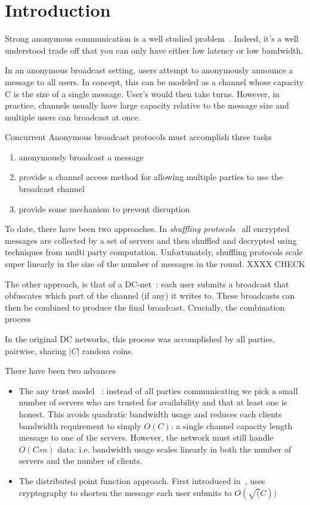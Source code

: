 
\section{Introduction}
Strong anonymous communication is a well studied problem~\cite{}. Indeed, it's a well understood trade off that you can only have either low latency or low bandwidth.

In an anonymous broadcast setting, users attempt to anonymously announce a message to all users. In concept, this can be modeled as a channel whose capacity C is the size of a single message. User's would then take turns. However, in practice, channels usually have large capacity relative to the message size and multiple users can broadcast at once.

Concurrent Anonymous broadcast protocols must accomplish three tasks
\begin{enumerate}
	\item anonymously broadcast a message
	\item provide a channel access method for allowing multiple parties to use the broadcast channel
	\item provide some mechanism to prevent disruption
\end{enumerate}

To date, there have been two approaches. In \emph{shuffling protocols}~\cite{CCS:LYKGKM19,USENIX:AKTZ17} all encrypted messages are collected by a set of servers and then shuffled and decrypted using techniques from multi party computation. Unfortunately, shuffling protocols scale super linearly in the size of the number of messages in the round.  XXXX CHECK

The other approach, is that of a DC-net~\cite{JC:Chaum88}: each user submits a broadcast that obfuscates which part of the channel (if any) it writes to.  These broadcasts can then be combined to produce the final broadcast. Crucially, the combination process

In the original DC networks, this process was accomplished  by all parties, pairwise, sharing $|C|$ random coins.

There have been two advances
\begin{itemize}
	\item The any trust model ~\cite{CCS:CorFor10}: instead of all parties communicating we pick a small number of servers who are trusted for availability and that at least one is honest. This avoids quadratic bandwidth usage and reduces each clients bandwidth requirement to simply $O(C)$: a single channel capacity length message to one of the servers. However, the network must still handle $O(Csn)$ data: i.e. bandwidth usage scales linearly in both the number of servers and the number of clients.
	\item The distributed point function approach. First introduced in~\cite{SP:CorBonMaz15}, uses cryptography to shorten the message each user submits to $O(\sqrt(C))$
\end{itemize}
